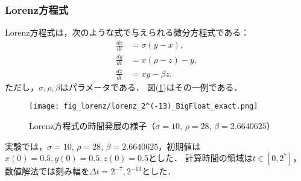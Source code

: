 \subsubsection{Lorenz方程式}
Lorenz方程式は，次のような式で与えられる微分方程式である：
\begin{align}
    \frac{dx}{dt} &= \sigma(y-x), \\
    \frac{dy}{dt} &= x(\rho-z)-y, \\
    \frac{dz}{dt} &= xy - \beta z.
\end{align}
ただし，$\sigma,\rho,\beta$はパラメータである．
図(\ref{fig:lorenz})はその一例である．
\begin{figure}[H]
    \centering
    \texttt{[image: fig\_lorenz/lorenz\_2^(-13)\_BigFloat\_exact.png]}
    \caption{Lorenz方程式の時間発展の様子（$\sigma=10$, $\rho=28$, $\beta=2.6640625$）}
    \label{fig:lorenz}
\end{figure}
実験では，$\sigma=10$, $\rho=28$, $\beta=2.6640625$，初期値は$x(0) = 0.5, y(0) = 0.5, z(0) = 0.5$とした．
計算時間の領域は$t \in [0,2^7]$，数値解法では刻み幅を$\Delta t =  2^{-7}, 2^{-13}$とした．
